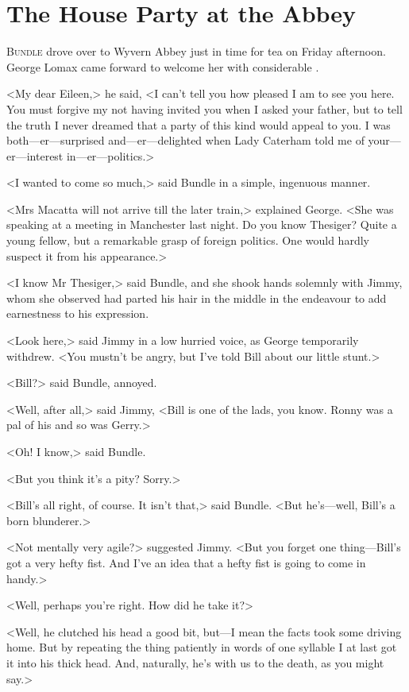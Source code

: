 \chapter{The House Party at the Abbey}

\lettrine{B}{undle} drove over to Wyvern Abbey just in time for tea on Friday afternoon. George Lomax came forward to welcome her with considerable .

\zz
<My dear Eileen,> he said, <I can't tell you how pleased I am to see you here. You must forgive my not having invited you when I asked your father, but to tell the truth I never dreamed that a party of this kind would appeal to you. I was both—er—surprised and—er—delighted when Lady Caterham told me of your—er—interest in—er—politics.>

<I wanted to come so much,> said Bundle in a simple, ingenuous manner.

<Mrs Macatta will not arrive till the later train,> explained George. <She was speaking at a meeting in Manchester last night. Do you know Thesiger? Quite a young fellow, but a remarkable grasp of foreign politics. One would hardly suspect it from his appearance.>

<I know Mr Thesiger,> said Bundle, and she shook hands solemnly with Jimmy, whom she observed had parted his hair in the middle in the endeavour to add earnestness to his expression.

<Look here,> said Jimmy in a low hurried voice, as George temporarily withdrew. <You mustn't be angry, but I've told Bill about our little stunt.>

<Bill?> said Bundle, annoyed.

<Well, after all,> said Jimmy, <Bill is one of the lads, you know. Ronny was a pal of his and so was Gerry.>

<Oh! I know,> said Bundle.

<But you think it's a pity? Sorry.>

<Bill's all right, of course. It isn't that,> said Bundle. <But he's—well, Bill's a born blunderer.>

<Not mentally very agile?> suggested Jimmy. <But you forget one thing—Bill's got a very hefty fist. And I've an idea that a hefty fist is going to come in handy.>

<Well, perhaps you're right. How did he take it?>

<Well, he clutched his head a good bit, but—I mean the facts took some driving home. But by repeating the thing patiently in words of one syllable I at last got it into his thick head. And, naturally, he's with us to the death, as you might say.>

